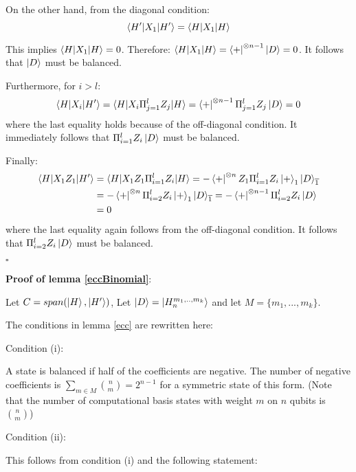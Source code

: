 \documentclass[12pt]{iopart}
\begin{document}
On the other hand, from the diagonal condition:
\begin{equation}
\braket{H^{\prime}|X_1|H^{\prime}} = \braket{H|X_1|H}
\end{equation}

This implies $\braket{H|X_1|H} = 0$.
Therefore: $\braket{H|X_1|H} = \bra{+}^{\otimes n-1}\ket{D} = 0$. It follows that $\ket{D}$ must be balanced. 

Furthermore, for $i>l$:
\begin{equation}
\braket{H|X_i|H^\prime} = \braket{H|X_i\Pi_{j=1}^l Z_j|H} = \bra{+}^{\otimes n-1}\Pi_{j=1}^l Z_j\ket{D} = 0
\end{equation}
where the last equality holds because of the off-diagonal condition.
It immediately follows that $\Pi_{i=1}^l Z_i\ket{D}$ must be balanced.

Finally:
\begin{eqnarray}
\braket{H|X_1Z_1|H^\prime} &= \braket{H|X_1Z_1\Pi_{i=1}^l Z_i|H} = -\bra{+}^{\otimes n}Z_1\Pi_{i=1}^l Z_i\ket{+}_1\ket{D}_{\overline{1}} \nonumber \\
&= -\bra{+}^{\otimes n}\Pi_{i=2}^l Z_i\ket{+}_1\ket{D}_{\overline{1}} = -\bra{+}^{\otimes n-1}\Pi_{i=2}^l Z_i\ket{D} \nonumber \\
 &=  0
\end{eqnarray}
where the last equality again follows from the off-diagonal condition. It follows that 
$\Pi_{i=2}^l Z_i\ket{D}$ must be balanced.

\begin{flushright}
$\square$
\end{flushright}




\textbf{Proof of lemma \ref{eccBinomial}}:

Let $C = span(\ket{H},\ket{H^\prime})$, Let $\ket{D} = \ket{H^{m_1,..,m_k}_{n}}$ and let $M = \{m_1,...,m_k\}$.

The conditions in lemma \ref{ecc} are rewritten here:

Condition (i):

A state is balanced if half of the coefficients are negative. The number of negative coefficients is $\sum_{m \in M} {n \choose m} = 2^{n-1}$ for a symmetric state of this form. (Note that the number of computational basis states with weight $m$ on $n$ qubits is ${n \choose m}$)

Condition (ii):

This follows from condition (i) and the following statement:
\end{document}
